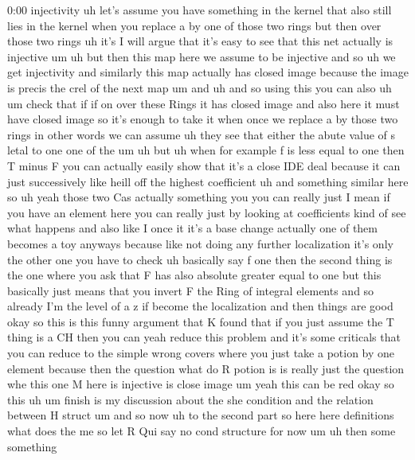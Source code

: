\begin{unfinished}{0:00}
injectivity  uh  let's  assume  you  have
something  in  the  kernel  that  also  still
lies  in  the  kernel  when  you  replace  a  by
one  of  those  two  rings  but  then  over
those  two
rings  uh  it's  I  will  argue  that  it's
easy  to  see  that  this  net  actually  is
injective
um  uh  but  then  this  map  here  we  assume
to  be  injective  and  so  uh  we  get
injectivity  and  similarly  this  map
actually  has  closed  image
because  the  image  is  precis  the  crel  of
the  next  map
um
and  uh  and  so  using  this  you  can  also  uh
um  check  that  if  if  on  over  these  Rings
it  has  closed  image  and  also  here  it
must  have  closed  image
so  it's  enough  to  take  it  when  once  we
replace  a  by  those  two  rings  in  other
words  we  can  assume
uh  they  see  that  either  the  abute  value
of
s  letal  to
one  one  of
the
um
uh  but  uh  when  for  example  f  is  less
equal  to  one  then  T  minus  F  you  can
actually  easily  show  that  it's  a  close
IDE  deal  because  it  can  just
successively  like  heill  off  the  highest
coefficient  uh  and  something  similar
here  so  uh  yeah  those  two  Cas  actually
something
you
you  can  really
just  I  mean  if  you  have  an  element  here
you  can  really  just  by  looking  at
coefficients  kind  of  see  what
happens
and  also  like  I  once  it  it's  a  base
change  actually  one  of  them  becomes  a
toy  anyways  because  like  not  doing  any
further  localization  it's  only  the  other
one  you  have  to  check
uh
basically  say  f  one  then  the  second
thing  is  the  one  where  you  ask  that  F
has  also  absolute  greater  equal  to  one
but  this  basically  just  means  that  you
invert  F  the  Ring  of  integral  elements
and  so  already  I'm  the  level  of  a  z  if
become  the  localization  and  then  things
are
good
okay
so  this  is  this  funny  argument  that  K
found  that  if  you  just  assume  the  T
thing  is  a  CH  then  you  can  yeah  reduce
this  problem  and  it's  some  criticals
that  you  can  reduce  to  the  simple  wrong
covers  where  you  just  take  a  potion  by
one  element  because  then  the  question
what  do  R  potion  is  is  really  just  the
question  whe  this  one  M  here  is
injective  is  close  image  um  yeah  this
can  be
red  okay  so  this  uh  um  finish  is  my
discussion  about  the  she  condition  and
the  relation  between
H
struct  um  and
so  now
uh
to  the  second
part  so  here  here
definitions  what  does  the  me  so  let
R  Qui
say  no  cond  structure  for  now
um  uh  then  some  something

\end{unfinished}
